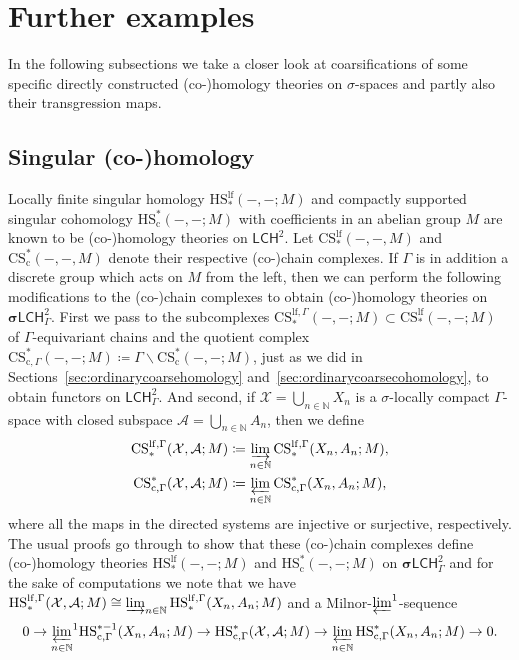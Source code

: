 \documentclass[pdftex]{sigma}
\numberwithin{equation}{section}
\theoremstyle{definition}
\newcommand{\N}{\mathbb{N}}
\newcommand{\cX}{\mathcal{X}}
\newcommand{\cA}{\mathcal{A}}
\newcommand{\categoryfont}[1]{\mathsf{#1}}
\newcommand{\sLCHz}[1][\Gamma]{\boldsymbol\sigma\categoryfont{LCH}_{#1}^2}
\newcommand{\LCHz}[1][\Gamma]{\categoryfont{LCH}_{#1}^2}
\newcommand{\HS}{\mathrm{HS}}
\newcommand{\CS}{\mathrm{CS}}
\newcommand{\lf}{\mathrm{lf}}
\newcommand{\cs}{\mathrm{c}}
\newcommand{\blank}{-}
\begin{document}
\section{Further examples}\label{sec:FurtherExamples}

In the following subsections we take a closer look at coarsifications of some specific directly constructed \mbox{(co-)}homology theories on $\sigma$-spaces and partly also their transgression maps.

\subsection{Singular (co-)homology}
Locally finite singular homology $\HS^{\lf}_*(\blank,\blank;M)$ and compactly supported singular cohomology $\HS_{\cs}^*(\blank,\blank;M)$ with coefficients in an abelian group $M$ are known to be \mbox{(co-)}homology theories on $\LCHz[]$. Let $\CS^{\lf}_*(\blank,\blank,M)$ and $\CS_{\cs}^*(\blank,\blank,M)$ denote their respective \mbox{(co-)}chain complexes. If $\Gamma$ is in addition a discrete group which acts on $M$ from the left, then we can perform the following modifications to the \mbox{(co-)}chain complexes to obtain \mbox{(co-)}homology theories on $\sLCHz$.
First we pass to the subcomplexes $\CS^{\lf,\Gamma}_*(\blank,\blank;M)\subset\CS^{\lf}_*(\blank,\blank;M)$ of $\Gamma$-equivariant chains and the quotient complex $\CS_{\cs,\Gamma}^*(\blank,\blank;M)\coloneqq\Gamma\backslash\CS_{\cs}^*(\blank,\blank;M)$, just as we did in Sections~\ref{sec:ordinarycoarsehomology} and~\ref{sec:ordinarycoarsecohomology}, to obtain functors on $\LCHz$. And second, if $\cX=\bigcup_{n\in\N}X_n$ is a $\sigma$-locally compact $\Gamma$-space with closed subspace $\cA=\bigcup_{n\in\N}A_n$, then we define
\begin{gather*}
\CS^{\lf,\Gamma}_*(\cX,\cA;M)\coloneqq\varinjlim_{n\in\N}\CS^{\lf,\Gamma}_*(X_n,A_n;M),
\\
\CS_{\cs,\Gamma}^*(\cX,\cA;M)\coloneqq\varprojlim_{n\in\N}\CS_{\cs,\Gamma}^*(X_n,A_n;M),
\end{gather*}
{\sloppy where all the maps in the directed systems are injective or surjective, respectively.
The usual proofs go through to show that these \mbox{(co-)}chain complexes define \mbox{(co-)}homology theories $\HS^{\lf}_*(\blank,\blank;M)$ and $\HS_{\cs}^*(\blank,\blank;M)$ on $\sLCHz$ and for the sake of computations we note that we have $\HS^{\lf,\Gamma}_*(\cX,\cA;M)\cong\varinjlim_{n\in\N}\HS^{\lf,\Gamma}_*(X_n,A_n;M)$ and a Milnor-${\varprojlim}^1$-sequence
\[
0\to {\varprojlim_{n\in\N}}^1\HS_{\cs,\Gamma}^{*-1}(X_n,A_n;M)\to \HS_{\cs,\Gamma}^*(\cX,\cA;M)\to \varprojlim_{n\in\N}\HS_{\cs,\Gamma}^*(X_n,A_n;M)\to 0.
\]}
\end{document}
